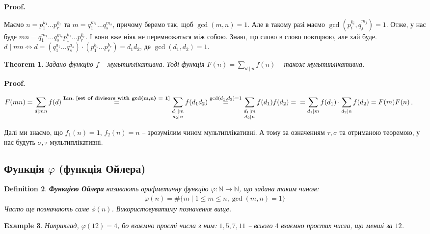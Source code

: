 \documentclass[a4paper, 14pt]{extarticle}
\makeatletter
\theoremstyle{theoremdd}
\newtheorem{theorem}{Theorem}[subsection]
\theoremstyle{theoremdd}
\newtheorem{definition}[theorem]{Definition}
\theoremstyle{theoremdd}
\theoremstyle{theoremdd}
\newtheorem{example}[theorem]{Example}
\theoremstyle{theoremdd}
\theoremstyle{theoremdd}
\theoremstyle{theoremdd}
\theoremstyle{theoremdd}
\def\qed{$\blacksquare$}
\renewenvironment{proof}[1][Proof.\\]{\par
\pushQED{\hfill \qed}%
\normalfont \topsep6\p@\@plus6\p@\relax
\trivlist
\item\relax
{\bfseries
#1\@addpunct{.}}\hspace\labelsep\ignorespaces
}{%
\popQED\endtrivlist\@endpefalse
}
\newcommand\lmref[1]{\textbf{Lm.~\ref{#1}}}
\makeatother
\begin{document}
\begin{proof}
Маємо $n = p_1^{k_1} \dots p_r^{k_r}$ та $m = q_1^{m_1} \dots q_s^{m_s}$, причому беремо так, щоб $\gcd(m,n) = 1$. Але в такому разі маємо $\gcd\left(p_i^{k_i},q_j^{m_j}\right) = 1$. Отже, у нас буде $mn = q_1^{m_1} \dots q_s^{m_s} p_1^{k_1} \dots p_r^{k_r}$. І вони вже ніяк не перемножаться між собою. Знаю, що слово в слово повторюю, але хай буде.\\
$d \mid mn \iff d = (q_1^{a_1} \dots q_s^{a_s}) \cdot (p_1^{b_1} \dots p_r^{b_r}) = d_1 d_2$, де $\gcd(d_1,d_2) = 1$.
\end{proof}

\begin{theorem}
Задано функцію $f$ -- мультиплікативна. Тоді функція $F(n) = \displaystyle\sum_{d \mid n} f(n)$ -- також мультиплікативна.
\end{theorem}

\begin{proof}
$F(mn) = \displaystyle\sum_{d \mid mn} f(d) \overset{\text{\lmref{set of divisors with gcd(m,n) = 1}}}{=} \sum_{\substack{d_1 \mid m \\ d_2 \mid n}} f(d_1 d_2) \overset{\gcd(d_1,d_2) = 1}{=} \sum_{\substack{d_1 \mid m \\ d_2 \mid n}} f(d_1) f(d_2) = \\
= \sum_{d_1 \mid m} f(d_1) \cdot \sum_{d_2 \mid n} f(d_2) = F(m) F(n)$.
\end{proof}

Далі ми знаємо, що $f_1(n) = 1$, $f_2(n) = n$ -- зрозумілим чином мультиплікативні. А тому за означенням $\tau,\sigma$ та отриманою теоремою, у нас будуть $\sigma,\tau$ мультиплікативні.

\subsection{Функція $\varphi$ (функція Ойлера)}
\begin{definition}
\textbf{Функцією Ойлера} називають арифметичну функцію $\varphi \colon \mathbb{N} \to \mathbb{N}$, що задана таким чином:
\begin{align*}
\varphi(n) = \#\{m \mid 1 \leq m \leq n, \gcd(m,n) = 1\}
\end{align*}
Часто ще позначають саме $\phi(n)$. Використовуватиму позначення вище.
\end{definition}

\begin{example}
Наприклад, $\varphi(12) = 4$, бо взаємно прості числа з ним: $1,5,7,11$ -- всього $4$ взаємно простих числа, що менші за $12$.
\end{example}
\end{document}
